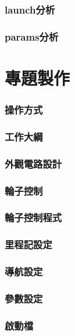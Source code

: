\documentclass{article}
\begin{document}
\section{launch分析}

\section{params分析}


\part{專題製作}
\section{操作方式}

\section{工作大綱}

\section{外觀電路設計}



\clearpage
\section{輪子控制}

\section{輪子控制程式}


\section{里程記設定}

\section{導航設定}

\clearpage
\section{參數設定}

\section{啟動檔}

\end{document}
